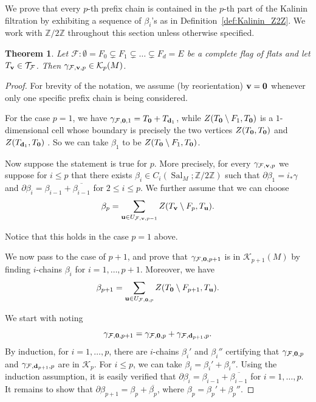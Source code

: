 \documentclass{amsart}
\newtheorem{theorem}{Theorem}[section]
\newcommand\Fcal{{\mathcal F}}
\newcommand\Kcal{{\mathcal K}}
\newcommand\Tcal{{\mathcal T}}
\newcommand\dd{{\bf d}}
\newcommand\vv{{\bf v}}
\newcommand\Ztwo{{\mathbb Z}/2{\mathbb Z}}
\DeclareMathOperator{\Sal}{Sal}
\begin{document}
{We prove that every $p$-th prefix chain is contained in the $p$-th part of the Kalinin filtration by exhibiting a sequence of $\beta_i$'s as in Definition~\ref{def:Kalinin_Z2Z}.
We work with $\Ztwo$ throughout this section unless otherwise specified.

\begin{theorem} \label{thm:Kalinin_prefix}
Let $\Fcal:\emptyset=F_0 \subsetneq  F_1 \subsetneq \ldots \subsetneq F_d=E$ be a complete flag of flats and let $T_{\vv}\in\Tcal_\Fcal$.
Then $\gamma_{\Fcal,\vv,p}\in\Kcal_p(M)$.
\end{theorem}

\begin{proof}
For brevity of the notation, we assume (by reorientation) $\vv={\bf 0}$ whenever only one specific prefix chain is being considered.

For the case $p=1$, we have $\gamma_{\Fcal, {\bf 0},1}=T_{{\bf 0}}+T_{\dd_1}$, while $Z(T_{\bf 0}\setminus F_1,T_{\bf 0})$ is a $1$-dimensional cell whose boundary is precisely the two vertices $Z(T_{\bf 0},T_{\bf 0})$ and 
$Z(T_{\dd_1},T_{\bf 0})$ .
So we can take $\beta_1$ to be $Z(T_{\bf 0}\setminus F_1,T_{\bf 0})$.

Now suppose the statement is true for $p$. More precisely, for every $\gamma_{\Fcal,\vv,p}$ we suppose for $i \leq p$ that 
there exists $ \beta_i \in C_i(\Sal_M; \Ztwo)$ such that 
$\partial\beta_1= i_{\ast} \gamma$ and $\partial\beta_i=\beta_{i-1}+\overline{\beta_{i-1}}$ for $ 2 \leq i \leq p$. 
We further assume that we can choose 
\begin{equation}\label{eq:beta_p}
    \beta_{p}  = \sum_{{\bf u}\in U_{\Fcal,\vv,p-1}} Z(T_{\vv}\setminus F_{p},T_{\bf u}).
\end{equation}

Notice that this holds in the case $p = 1$ above.

We now pass to the case of $p+1$, and prove that $\gamma_{\Fcal,{\bf 0},p+1}$
is in $\Kcal_{p+1}(M)$ by finding $i$-chains $\beta_i$ for $i = 1, \dots, p+1$. Moreover, we have 
$$\beta_{p+1} = \sum_{{\bf u}\in U_{\Fcal, {\bf 0}, p}} Z(T_{\bf 0}\setminus F_{p+1},T_{\bf u}).$$
 
We start with noting $$\gamma_{\Fcal, {\bf 0},p+1}=\gamma_{\Fcal, {\bf 0},p}+\gamma_{\Fcal, \dd_{p+1},p}.$$ 
By induction, for $i = 1, \ldots, p$, 
there are $i$-chains $\beta_i'$ and $\beta_i''$ certifying that $\gamma_{\Fcal, {\bf 0},p}$ and $\gamma_{\Fcal, \dd_{p+1},p} $ are in $\Kcal_p$.
For $i \leq p$, we can take $\beta_i = \beta_i' + \beta_i''$. Using the induction assumption, it is easily verified that $\partial \beta_i = \beta_{i-1} +\overline{\beta_{i-1}}$ for $i = 1, \ldots, p$. 
It remains to show that $\partial \beta_{p+1} = \beta_p + \overline{\beta_{p}}$, where $\beta_p = \beta_p' + \beta_p''$.


\end{proof}}
\end{document}
